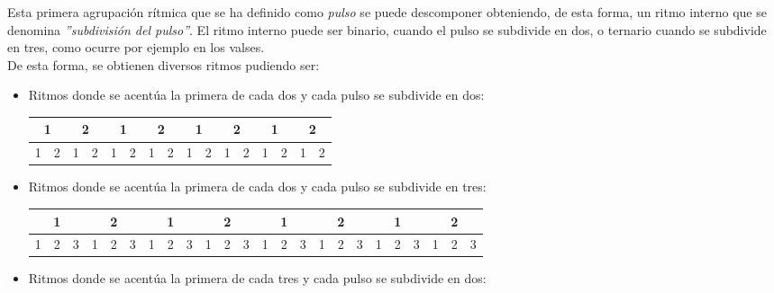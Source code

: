 \documentclass[a4paper, openright, 11pt, titlepage]{report}
\theoremstyle{definition}\newtheorem{defin}[propo]{Definition}
\theoremstyle{definition}\newtheorem{obser}[propo]{Remark}
\theoremstyle{definition}\newtheorem{ejem}[propo]{Ejemplo}
\theoremstyle{definition}\newtheorem{algoritmo}[propo]{Algoritmo}
\begin{document}
Esta primera agrupación rítmica que se ha definido como \textit{pulso} se puede descomponer obteniendo, de esta forma, un ritmo interno que se denomina \textit{''subdivisión del pulso''}. El ritmo interno puede ser binario, cuando el pulso se subdivide en dos, o ternario cuando se subdivide en tres, como ocurre por ejemplo en los valses.\\
De esta forma, se obtienen diversos ritmos pudiendo ser:
\begin{itemize}
    \item Ritmos donde se acentúa la primera de cada dos y cada pulso se subdivide en dos:
    \begin{table}[H]
    \centering
    \begin{tabular}{|c|c|c|c|c|c|c|c|c|c|c|c|c|c|c|c|}
    \hline
        \multicolumn{2}{|c}{\cellcolor{acento}1} & \multicolumn{2}{|c}{2} & \multicolumn{2}{|c}{\cellcolor{acento}1} & \multicolumn{2}{|c}{2} & \multicolumn{2}{|c}{\cellcolor{acento}1} & \multicolumn{2}{|c}{2} & \multicolumn{2}{|c}{\cellcolor{acento}1} & \multicolumn{2}{|c|}{2} \\
        \hline
        \cellcolor{acento}1 & 2 & 1 & 2 & \cellcolor{acento}1 & 2 & 1 & 2 & \cellcolor{acento}1 & 2 & 1 & 2 & \cellcolor{acento}1 & 2 & 1 & 2\\
        \hline
    \end{tabular}
\end{table}
    \item Ritmos donde se acentúa la primera de cada dos y cada pulso se subdivide en tres:
    \begin{table}[H]
    \centering
    \begin{tabular}{|c|c|c|c|c|c|c|c|c|c|c|c|c|c|c|c|c|c|c|c|c|c|c|c|}
    \hline
        \multicolumn{3}{|c}{\cellcolor{acento}1} & \multicolumn{3}{|c}{2} & \multicolumn{3}{|c}{\cellcolor{acento}1} & \multicolumn{3}{|c}{2} & \multicolumn{3}{|c}{\cellcolor{acento}1} & \multicolumn{3}{|c}{2} & \multicolumn{3}{|c}{\cellcolor{acento}1} & \multicolumn{3}{|c|}{2} \\
        \hline
        \cellcolor{acento}1 & 2 & 3 & 1 & 2 & 3 & \cellcolor{acento}1 & 2 & 3 & 1 & 2 & 3 & \cellcolor{acento}1 & 2 & 3 & 1 & 2 & 3 & \cellcolor{acento}1 & 2 & 3 & 1 & 2 & 3 \\
        \hline
    \end{tabular}
\end{table}
    \item Ritmos donde se acentúa la primera de cada tres y cada pulso se subdivide en dos:
    \begin{table}[H]

\end{table}
\end{itemize}
\end{document}

